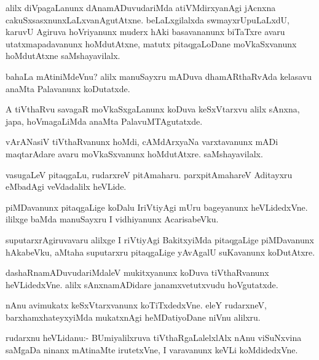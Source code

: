 \documentclass{article}
\begin{document}
\begin{mn}%
alilx diVpagaLanunx dAnamADuvudariMda atiVMdirxyanAgi jAcnxna
cakuSxsasxnunxLaLxvanAgutAtxne. beLaLxgilalxda swmayxrUpuLaLxdU,
karuvU Agiruva hoVriyanunx muderx hAki basavananunx biTaTxre avaru
utatxmapadavanunx hoMdutAtxne, matutx pitaqgaLoDane moVkaSxvanunx
hoMdutAtxne saMshayavilalx.
\end{mn}

\begin{mn}%
bahaLa mAtiniMdeVnu? alilx manuSayxru mADuva dhamARthaRvAda kelasavu
anaMta Palavanunx koDutatxde.
\end{mn}

\begin{mn}
A tiVthaRvu savagaR moVkaSxgaLanunx koDuva keSxVtarxvu alilx sAnxna,
japa, hoVmagaLiMda anaMta PalavuMTAgutatxde.
\end{mn}

\begin{mn}
vArANasiV tiVthaRvanunx hoMdi, cAMdArxyaNa varxtavanunx mADi
maqtarAdare avaru moVkaSxvanunx hoMdutAtxre. saMshayavilalx.
\end{mn}

\begin{mn}
vasugaLeV pitaqgaLu, rudarxreV pitAmaharu. parxpitAmahareV Aditayxru
eMbadAgi veVdadalilx heVLide.
\end{mn}

\begin{mn}
piMDavanunx pitaqgaLige koDalu IriVtiyAgi mUru bageyanunx
heVLidedxVne. ililxge baMda manuSayxru I vidhiyanunx AcarisabeVku.
\end{mn}

\begin{mn}%
suputarxrAgiruvavaru alilxge I riVtiyAgi BakitxyiMda pitaqgaLige
piMDavanunx hAkabeVku, aMtaha suputarxru pitaqgaLige yAvAgalU
suKavanunx koDutAtxre.
\end{mn}

\begin{mn}
dashaRnamADuvudariMdaleV mukitxyanunx koDuva tiVthaRvanunx
heVLidedxVne. alilx sAnxnamADidare janamxvetutxvudu hoVgutatxde.
\end{mn}

\begin{mn}
nAnu avimukatx keSxVtarxvanunx koTiTxdedxVne. eleY rudarxneV,
barxhamxhateyxyiMda mukatxnAgi heMDatiyoDane niVnu alilxru.
\end{mn}

\begin{mn}
rudarxnu heVLidanu:- BUmiyalilxruva tiVthaRgaLalelxlAlx nAnu
viSuNxvina saMgaDa ninanx mAtinaMte irutetxVne, I varavanunx keVLi koMdidedxVne.
\end{mn}
\end{document}
